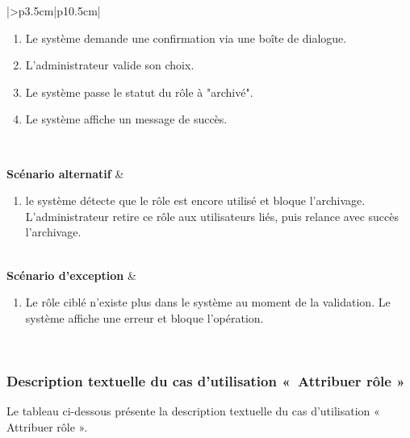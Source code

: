 \begin{longtable}{|>{}p{3.5cm}|p{10.5cm}|}
\begin{minipage}[t]{\linewidth}
\begin{enumerate}[label=\arabic*., leftmargin=0.6cm, nosep, itemsep=1pt]
\item Le système demande une confirmation via une boîte de dialogue.

\item L'administrateur valide son choix.

\item Le système passe le statut du rôle à "archivé".

\item Le système affiche un message de succès.

\end{enumerate}
\vspace{0.2cm}
\end{minipage} \\

\hline

\textbf{Scénario alternatif} &

\begin{enumerate}[label=A\arabic*.,nosep,leftmargin=0.6cm,topsep=0pt,itemsep=1pt]

\item  le système détecte que le rôle est encore utilisé et bloque l'archivage. L'administrateur retire ce rôle aux utilisateurs liés, puis relance avec succès l'archivage.



\end{enumerate} \\

\hline
\textbf{Scénario d'exception} &

\begin{enumerate}[label=E\arabic*.,nosep,leftmargin=0.6cm,topsep=0pt,itemsep=1pt]

\item  Le rôle ciblé n'existe plus dans le système au moment de la validation. Le système affiche une erreur et bloque l'opération.

\end{enumerate} \\

\hline

\end{longtable}

\normalsize



\subsubsection{Description textuelle du cas d’utilisation «~Attribuer rôle »}
\nopagebreak
Le tableau ci-dessous présente la description textuelle du cas d’utilisation « Attribuer rôle ».


